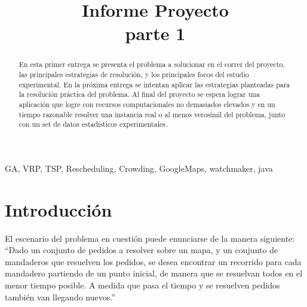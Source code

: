 \documentclass[9pt,conference]{IEEEtran}
\begin{document}
	\title{Informe Proyecto\\ parte 1}
	\author{
		\and
	}

	\maketitle

	\begin{abstract}
	En esta primer entrega se presenta el problema a solucionar en el correr del proyecto, las principales estrategias de resolución, y los principales focos del estudio experimental.
	En la próxima entrega se intentan aplicar las estrategias planteadas para la resolución práctica del problema. Al final del proyecto se espera lograr una aplicación que logre con recursos computacionales no demasiados elevados y en un tiempo razonable resolver una instancia real o al menos verosímil del problema, junto con un set de datos estadísticos experimentales.
	\end{abstract}
	\begin{IEEEkeywords}
	GA, VRP, TSP, Rescheduling, Crowding, GoogleMaps, watchmaker, java 
	\end{IEEEkeywords}

	\section{Introducción}

	El escenario del problema en cuestión puede enunciarse de la manera siguiente:\\
	``Dado un conjunto de pedidos a resolver sobre un mapa, y un conjunto de mandaderos que resuelven los pedidos, se desea encontrar un recorrido para cada mandadero partiendo de un punto inicial, de manera que se resuelvan todos en el menor tiempo posible. A medida que pasa el tiempo y se resuelven pedidos también van llegando nuevos.''
\end{document}
